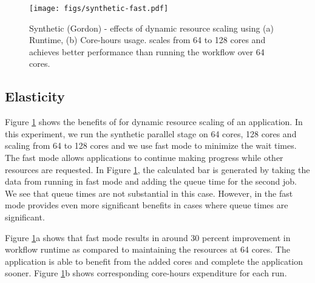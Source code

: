 \begin{figure}
  \centering
  \texttt{[image: figs/synthetic-fast.pdf]}
  \caption{\small Synthetic (Gordon) - effects of dynamic resource scaling using \systemname (a) Runtime, (b) Core-hours usage. \systemname scales from 64 to 128  cores and achieves better performance than running the workflow over 64 cores. }
  \label{fig:elastic_demand}
  \vspace{-0.4cm}
\end{figure}

\subsection{\systemname Elasticity}

Figure \ref{fig:elastic_demand} shows the benefits of \systemname for
dynamic resource scaling of an application. In this experiment, we run
the synthetic parallel stage on 64 cores, 128 cores and scaling from
64 to 128 cores and we use fast mode to minimize the wait times. The
fast mode allows applications to continue making progress while other
resources are requested. In Figure \ref{fig:elastic_demand}, the \systemname
calculated bar is generated by taking the data from running \systemname in
fast mode and adding the queue time for the second job. We see that
queue times are not substantial in this case. However, \systemname in the fast mode
provides even more significant benefits in cases where queue times
are significant. 




Figure \ref{fig:elastic_demand}a shows that fast mode results in around 30
percent improvement in workflow runtime as compared to maintaining the
resources at 64 cores. The application is able to benefit from the
added cores and complete the application sooner. Figure
\ref{fig:elastic_demand}b shows corresponding core-hours expenditure
for each run.






